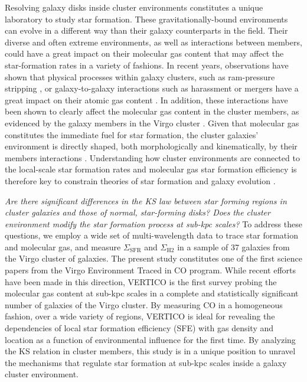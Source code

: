 \documentclass[longauth]{aa}
\begin{document}
Resolving galaxy disks inside cluster environments constitutes a unique laboratory to study star formation. These gravitationally-bound environments can evolve in a different way than their galaxy counterparts in the field. Their diverse and often extreme environments, as well as interactions between members, could have a great impact on their molecular gas content \citep[][]{Violino2018,Pan2018,Thorp2022} that may affect the star-formation rates in a variety of fashions. In recent years, observations have shown that physical processes within galaxy clusters, such as ram-pressure stripping \citep[e.g.,][]{Gunn1972,Cortese2021}, or galaxy-to-galaxy interactions such as harassment or mergers have a great impact on their atomic gas content \citep{Boselli2006,Boselli2014}. In addition, these interactions have been shown to clearly affect the molecular gas content in the cluster members, as evidenced by the galaxy members in the Virgo cluster \citep{Fumagalli2009,Boselli2014b}. Given that molecular gas constitutes the immediate fuel for star formation, the cluster galaxies’ environment is directly shaped, both morphologically and kinematically, by their members interactions \citep[e.g.,][]{Bumhyun2017,Bumhyun2018,Zabel2019,Lizee2021}. Understanding how cluster environments are connected to the local-scale star formation rates and molecular gas star formation efficiency is therefore key to constrain theories of star formation and galaxy evolution \citep{Chung2014,Nehlig2016,Moretti2020,Cramer2020,Lee2020,Cramer2021,Boselli2021}.

\textit{Are there significant differences in the KS law between star forming regions in cluster galaxies and those of normal, star-forming disks? Does the cluster environment modify the star formation process at sub-kpc scales?} To address these questions, we employ a wide set of multi-wavelength data to trace star formation and molecular gas, and measure $\Sigma_\mathrm{SFR}$ and $\Sigma_\mathrm{H2}$ in a sample of 37 galaxies from the Virgo cluster of galaxies. The present study constitutes one of the first science papers from the Virgo Environment Traced in CO \citep[VERTICO,][]{Brown2021} program. While recent efforts have been made in this direction, VERTICO is the first survey probing the molecular gas content at sub-kpc scales in a complete and statistically significant number of galaxies of the Virgo cluster. By measuring CO in a homogeneous fashion, over a wide variety of regions, VERTICO is ideal for revealing the dependencies of local star formation efficiency (SFE) with gas density and location as a function of environmental influence for the first time. By analyzing the KS relation in cluster members, this study is in a unique position to unravel the mechanisms that regulate star formation at sub-kpc scales inside a galaxy cluster environment.
\end{document}
